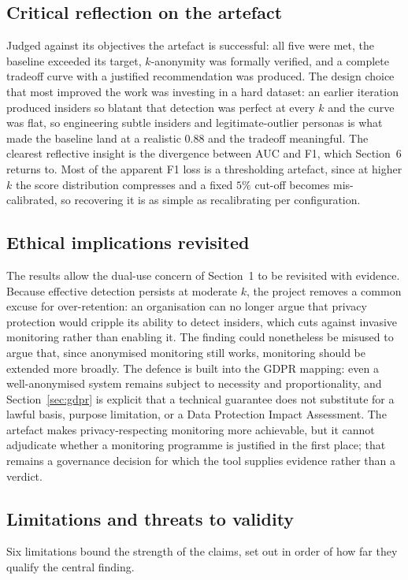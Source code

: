 \documentclass[10pt,a4paper]{article}
\begin{document}
\subsection{Critical reflection on the artefact}
Judged against its objectives the artefact is successful: all five were met, the baseline exceeded its target, $k$-anonymity was formally verified, and a complete tradeoff curve with a justified recommendation was produced. The design choice that most improved the work was investing in a hard dataset: an earlier iteration produced insiders so blatant that detection was perfect at every $k$ and the curve was flat, so engineering subtle insiders and legitimate-outlier personas is what made the baseline land at a realistic $0.88$ and the tradeoff meaningful. The clearest reflective insight is the divergence between AUC and F1, which Section~6 returns to. Most of the apparent F1 loss is a thresholding artefact, since at higher $k$ the score distribution compresses and a fixed $5\%$ cut-off becomes mis-calibrated, so recovering it is as simple as recalibrating per configuration.

\subsection{Ethical implications revisited}
The results allow the dual-use concern of Section~1 to be revisited with evidence. Because effective detection persists at moderate $k$, the project removes a common excuse for over-retention: an organisation can no longer argue that privacy protection would cripple its ability to detect insiders, which cuts against invasive monitoring rather than enabling it. The finding could nonetheless be misused to argue that, since anonymised monitoring still works, monitoring should be extended more broadly. The defence is built into the GDPR mapping: even a well-anonymised system remains subject to necessity and proportionality, and Section~\ref{sec:gdpr} is explicit that a technical guarantee does not substitute for a lawful basis, purpose limitation, or a Data Protection Impact Assessment. The artefact makes privacy-respecting monitoring more achievable, but it cannot adjudicate whether a monitoring programme is justified in the first place; that remains a governance decision for which the tool supplies evidence rather than a verdict.

\subsection{Limitations and threats to validity}
\label{sec:limitations}
Six limitations bound the strength of the claims, set out in order of how far they qualify the central finding.
\end{document}
